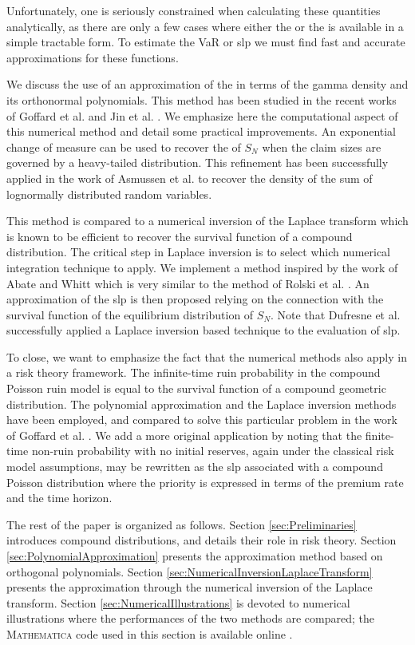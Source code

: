 Unfortunately, one is seriously constrained when calculating these quantities analytically, as there are only a few cases where either the \pdf or the \svf is available in a simple tractable form. To estimate the VaR or slp we must find fast and accurate approximations for these functions.

We discuss the use of an approximation of the \pdf in terms of the gamma density and its orthonormal polynomials. This method has been studied in the recent works of Goffard et al. \cite{GoLoPo15} and Jin et al. \cite{JiPrRe16}. We emphasize here the computational aspect of this numerical method and detail some practical improvements. An exponential change of measure can be used to recover the \pdf of $S_N$ when the claim sizes are governed by a heavy-tailed distribution. This refinement has been successfully applied in the work of Asmussen et al. \cite{AsGoLa16} to recover the density of the sum of lognormally distributed random variables.

This method is compared to a numerical inversion of the Laplace transform which is known to be efficient to recover the survival function of a compound distribution. The critical step in Laplace inversion is to select which numerical integration technique to apply. We implement a method inspired by the work of Abate and Whitt \cite{AbWh92} which is very similar to the method of Rolski et al. \cite[Chapter 5, Section 5]{RoScScTe99}. An approximation of the slp is then proposed relying on the connection with the survival function of the equilibrium distribution of $S_N$. Note that Dufresne et al. \cite{DuGaMo09} successfully applied a Laplace inversion based technique to the evaluation of slp.

To close, we want to emphasize the fact that the numerical methods also apply in a risk theory framework. The infinite-time ruin probability in the compound Poisson ruin model is equal to the survival function of a compound geometric distribution. The polynomial approximation and the Laplace inversion methods have been employed, and compared to solve this particular problem in the work of Goffard et al. \cite{GoLoPo16}. We add a more original application by noting that the finite-time non-ruin probability with no initial reserves, again under the classical risk model assumptions, may be rewritten as the slp associated with a compound Poisson distribution where the priority is expressed in terms of the premium rate and the time horizon.

The rest of the paper is organized as follows. Section \ref{sec:Preliminaries} introduces compound distributions, and details their role in risk theory. Section \ref{sec:PolynomialApproximation} presents the approximation method based on orthogonal polynomials. Section \ref{sec:NumericalInversionLaplaceTransform} presents the approximation through the numerical inversion of the Laplace transform. Section \ref{sec:NumericalIllustrations} is devoted to numerical illustrations where the performances of the two methods are compared; the \textsc{Mathematica} code used in this section is available online \cite{Code}.

